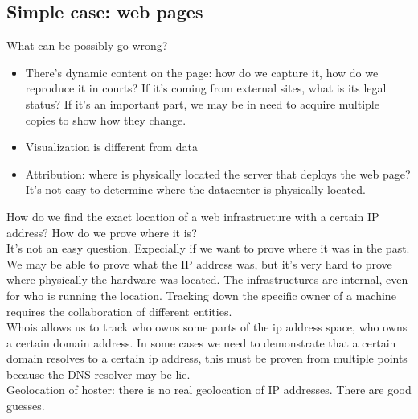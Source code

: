         \subsection{Simple case: web pages}
            What can be possibly go wrong?
            \begin{itemize}
                \item There's dynamic content on the page: how do we capture it, how do we reproduce it in courts? If it's coming from external sites, what is its legal status? If it's an important part, we may be in need to acquire multiple copies to show how they change.
                \item Visualization is different from data 
                \item Attribution: where is physically located the server that deploys the web page? It's not easy to determine where the datacenter is physically located.
            \end{itemize} 
            How do we find the exact location of a web infrastructure with a certain IP address? How do we prove where it is?\\
            It's not an easy question. Expecially if we want to prove where it was in the past. We may be able to prove what the IP address was, but it's very hard to prove where physically the hardware was located.
            The infrastructures are internal, even for who is running the location. Tracking down the specific owner of a machine requires the collaboration of different entities.\\
            Whois allows us to track who owns some parts of the ip address space, who owns a certain domain address. In some cases we need to demonstrate that a certain domain resolves to a certain ip address, this must be proven from multiple points because the DNS resolver may be lie.\\
            Geolocation of hoster: there is no real geolocation of IP addresses. There are good guesses.

